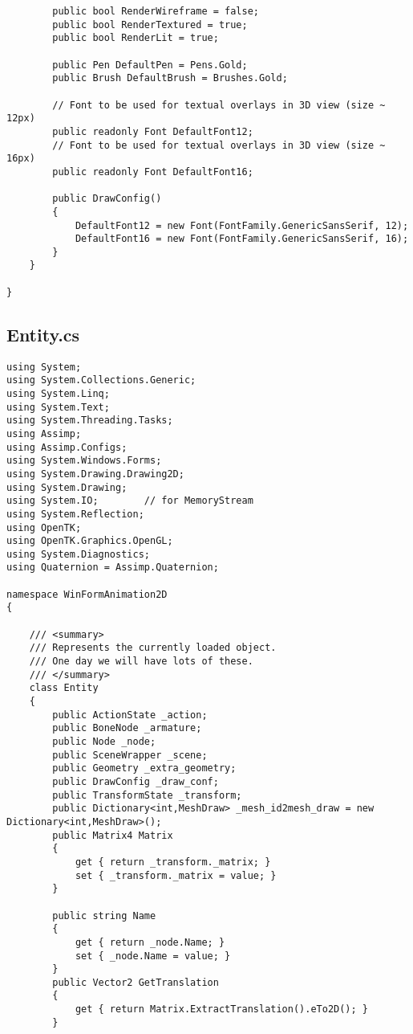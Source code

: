 \begin{scriptsize}
\begin{verbatim}
        public bool RenderWireframe = false;
        public bool RenderTextured = true;
        public bool RenderLit = true;

        public Pen DefaultPen = Pens.Gold;
        public Brush DefaultBrush = Brushes.Gold;

        // Font to be used for textual overlays in 3D view (size ~ 12px)
        public readonly Font DefaultFont12;
        // Font to be used for textual overlays in 3D view (size ~ 16px)
        public readonly Font DefaultFont16;

        public DrawConfig()
        {
            DefaultFont12 = new Font(FontFamily.GenericSansSerif, 12);
            DefaultFont16 = new Font(FontFamily.GenericSansSerif, 16);
        }
    }

}

\end{verbatim}
\subsection{Entity.cs}
\begin{verbatim}
using System;
using System.Collections.Generic;
using System.Linq;
using System.Text;
using System.Threading.Tasks;
using Assimp;
using Assimp.Configs;
using System.Windows.Forms;
using System.Drawing.Drawing2D;
using System.Drawing;
using System.IO;        // for MemoryStream
using System.Reflection;
using OpenTK;
using OpenTK.Graphics.OpenGL;
using System.Diagnostics;
using Quaternion = Assimp.Quaternion;

namespace WinFormAnimation2D
{

    /// <summary>
    /// Represents the currently loaded object.
    /// One day we will have lots of these.
    /// </summary>
    class Entity
    {
        public ActionState _action;
        public BoneNode _armature;
        public Node _node;
        public SceneWrapper _scene;
        public Geometry _extra_geometry;
        public DrawConfig _draw_conf;
        public TransformState _transform;
        public Dictionary<int,MeshDraw> _mesh_id2mesh_draw = new Dictionary<int,MeshDraw>();
        public Matrix4 Matrix
        {
            get { return _transform._matrix; }
            set { _transform._matrix = value; }
        }

        public string Name
        {
            get { return _node.Name; }
            set { _node.Name = value; }
        }
        public Vector2 GetTranslation
        {
            get { return Matrix.ExtractTranslation().eTo2D(); }
        }


\end{verbatim}
\end{scriptsize}
